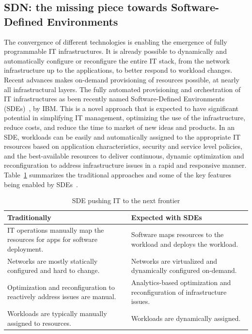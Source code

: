 \subsection{SDN: the missing piece towards Software-Defined Environments}

The convergence of different technologies is enabling the emergence of fully programmable IT infrastructures.
It is already possible to dynamically and automatically configure or reconfigure the entire IT stack, from the network infrastructure up to the applications, to better respond to workload changes.
Recent advances makes on-demand provisioning of resources possible, at nearly all infrastructural layers.
The fully automated provisioning and orchestration of IT infrastructures as been recently named Software-Defined Environments (SDEs)~\cite{racherla2014,li2014}, by IBM.
This is a novel approach that is expected to have significant potential in simplifying IT management, optimizing the use of the infrastructure, reduce costs, 
and reduce the time to market of new ideas and products.
In an SDE, workloads can be easily and automatically assigned to the appropriate IT resources based on application characteristics, security and service level policies, and the best-available resources to deliver continuous, dynamic optimization and reconfiguration to address infrastructure issues in a rapid and responsive manner.
Table~\ref{tab:TraditionalAndSDE} summarizes the traditional approaches and some of the key features being enabled 
by SDEs~\cite{alba2014,arnold2014}.

{\renewcommand{\arraystretch}{1.4}
\begin{table}[t!]
\caption{SDE pushing IT to the next frontier}
\label{tab:TraditionalAndSDE}
\newcommand{\firstcolumnwidth}{3.2cm} 
\begin{center}
\footnotesize
\begin{tabularx}{0.99\textwidth}{XX}
\hline
\textbf{Traditionally} & \textbf{Expected with SDEs} \\\hline
IT operations manually map the resources for apps for software deployment.  & Software maps resources to the workload and deploys the workload. \\\hline
Networks are mostly statically configured and hard to change.  & Networks are virtualized and dynamically configured on-demand. \\\hline
Optimization and reconfiguration to reactively address issues are manual.  & Analytics-based optimization and reconfiguration of infrastructure issues. \\\hline
Workloads are typically manually assigned to resources.  & Workloads are dynamically assigned. \\\hline
\end{tabularx}
\end{center}
\end{table}
}

